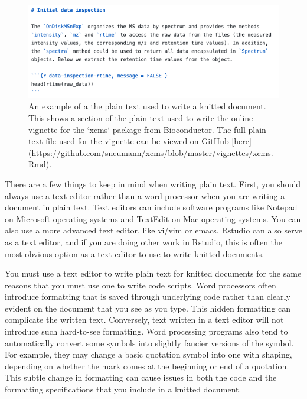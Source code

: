 \documentclass[]{tufte-book}
\begin{document}
\begin{figure}
\includegraphics[width=\textwidth]{figures/plaintext_vignette_example} \caption[An example of a the plain text used to write a knitted document]{An example of a the plain text used to write a knitted document. This shows a section of the plain text used to write the online vignette for the `xcms` package from Bioconductor. The full plain text file used for the vignette can be viewed on GitHub [here](https://github.com/sneumann/xcms/blob/master/vignettes/xcms.Rmd).}\label{fig:xcmsexampleplain}
\end{figure}

There are a few things to keep in mind when writing plain text. First, you
should always use a text editor rather than a word processor when you are
writing a document in plain text. Text editors can include software programs
like Notepad on Microsoft operating systems and TextEdit on Mac operating
systems. You can also use a more advanced text editor, like vi/vim or emacs.
Rstudio can also serve as a text editor, and if you are doing other work in
Rstudio, this is often the most obvious option as a text editor to use to write
knitted documents.

You must use a text editor to write plain text for knitted documents for the
same reasons that you must use one to write code scripts. Word processors often
introduce formatting that is saved through underlying code rather than clearly
evident on the document that you see as you type. This hidden formatting can
complicate the written text. Conversely, text written in a text editor will not
introduce such hard-to-see formatting. Word processing programs also tend to
automatically convert some symbols into slightly fancier versions of the symbol.
For example, they may change a basic quotation symbol into one with shaping,
depending on whether the mark comes at the beginning or end of a quotation. This
subtle change in formatting can cause issues in both the code and the formatting
specifications that you include in a knitted document.
\end{document}
